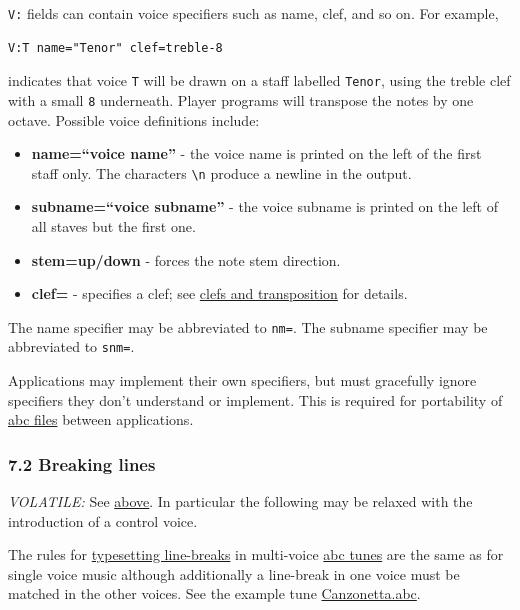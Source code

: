 \documentclass[oneside]{book}
\begin{document}
\texttt{V:} fields can contain voice specifiers such as name, clef, and
so on. For example,

\begin{verbatim}
V:T name="Tenor" clef=treble-8
\end{verbatim}

indicates that voice \texttt{T} will be drawn on a staff labelled
\texttt{Tenor}, using the treble clef with a small \texttt{8}
underneath. Player programs will transpose the notes by one octave.
Possible voice definitions include:

\begin{itemize}
\item
  \textbf{name=``voice name''} - the voice name is printed on the left
  of the first staff only. The characters \texttt{\textbackslash{}n}
  produce a newline in the output.
\item
  \textbf{subname=``voice subname''} - the voice subname is printed on
  the left of all staves but the first one.
\item
  \textbf{stem=up/down} - forces the note stem direction.
\item
  \textbf{clef=} - specifies a clef; see
  \protect\hyperlink{clefs_and_transposition}{clefs and transposition}
  for details.
\end{itemize}

The name specifier may be abbreviated to \texttt{nm=}. The subname
specifier may be abbreviated to \texttt{snm=}.

Applications may implement their own specifiers, but must gracefully
ignore specifiers they don't understand or implement. This is required
for portability of \protect\hyperlink{abc_file_definition}{abc files}
between applications.

\hypertarget{breaking_lines}{\subsubsection{7.2 Breaking
lines}\label{breaking_lines}}

\emph{VOLATILE:} See \protect\hyperlink{multiple_voices}{above}. In
particular the following may be relaxed with the introduction of a
control voice.

The rules for \protect\hyperlink{typesetting_line-breaks}{typesetting
line-breaks} in multi-voice \protect\hyperlink{abc_tune_definition}{abc
tunes} are the same as for single voice music although additionally a
line-break in one voice must be matched in the other voices. See the
example tune \protect\hyperlink{canzonettaabc}{Canzonetta.abc}.
\end{document}

